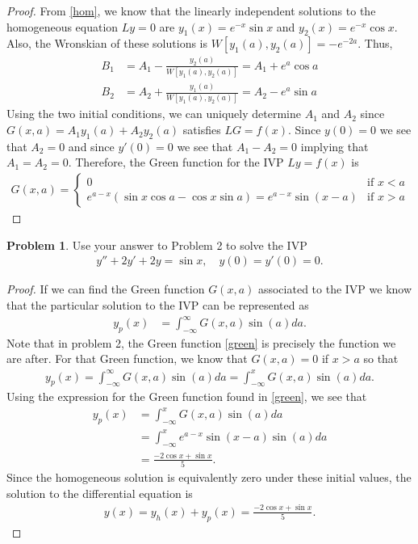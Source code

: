 \documentclass[12pt]{article}
\theoremstyle{definition}
\newtheorem{problem}{Problem}
\begin{document}
\begin{proof}
  From \eqref{hom}, we know that the linearly independent solutions to the
  homogeneous equation $Ly = 0$ are $y_1(x) = e^{-x}\sin x$ and $y_2(x) = e^{-x}\cos x$.
  Also, the Wronskian of these solutions is $W[y_1(a), y_2(a)] = -e^{-2a}$. Thus,
  \begin{align*}
    B_1 &= A_1 - \frac{y_2(a)}{W[y_1(a),y_2(a)]} = A_1 + e^{a}\cos a \\
    B_2 &= A_2 + \frac{y_1(a)}{W[y_1(a),y_2(a)]} = A_2 - e^{a}\sin a
  \end{align*}
  Using the two initial conditions, we can uniquely determine $A_1$ and $A_2$
  since $G(x, a) = A_1y_1(a) + A_2y_2(a)$ satisfies $LG = f(x)$. Since $y(0) = 0$
  we see that $A_2 = 0$ and since $y'(0) = 0$ we see that $A_1 - A_2 = 0$ implying that
  $A_1 = A_2 = 0$. Therefore, the Green function for the IVP $Ly = f(x)$ is
  \begin{align}\label{green}
    G(x, a) =
    \begin{cases}
      0 & \text{if $x < a$} \\
      e^{a-x}\left(\sin x\cos a  - \cos x \sin a \right) = e^{a-x}\sin(x-a) & \text{if $x > a$}
    \end{cases}
  \end{align}
\end{proof}
\newpage


\begin{problem}
  Use your answer to Problem 2 to solve the IVP
  \begin{align*}
    y'' + 2y' + 2y = \sin x, \quad y(0) = y'(0) = 0.
  \end{align*}
\end{problem}

\begin{proof}
  If we can find the Green function $G(x,a)$ associated to the IVP we know that
  the particular solution to the IVP can be represented as
  \begin{align*}
    y_p(x) &= \int_{-\infty}^{\infty}G(x,a)\sin(a) da.
  \end{align*}
  Note that in problem 2, the Green function \eqref{green} is precisely the function
  we are after. For that Green function, we know that $G(x,a) = 0$ if $x>a$ so that
  \begin{align*}
    y_p(x) = \int_{-\infty}^{\infty}G(x,a)\sin(a)da = \int_{-\infty}^{x}G(x,a)\sin(a)da.
  \end{align*}
  Using the expression for the Green function found in \eqref{green}, we see that
  \begin{align*}
    y_p(x) &= \int_{-\infty}^{x}G(x,a)\sin(a)da \\
    &= \int_{-\infty}^{x} e^{a-x}\sin(x-a)\sin(a)da\\
    &= \frac{-2\cos x + \sin x}{5}.
  \end{align*}
  Since the homogeneous solution is equivalently zero under these initial values,
  the solution to the differential equation is
  \begin{align*}
    y(x) = y_h(x) + y_p(x) = \frac{-2\cos x + \sin x}{5}.
  \end{align*}

\end{proof}
\newpage
\end{document}
